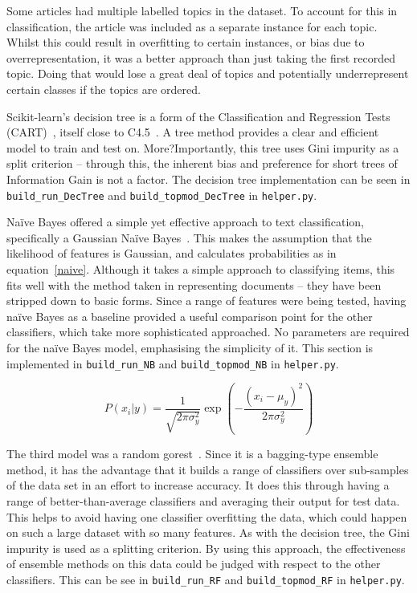 \documentclass[11pt]{article}
\begin{document}
Some articles had multiple labelled topics in the dataset. To account for this in classification, the article was included as a separate instance for each topic. Whilst this could result in overfitting to certain instances, or bias due to overrepresentation, it was a better approach than just taking the first recorded topic. Doing that would lose a great deal of topics and potentially underrepresent certain classes if the topics are ordered.

Scikit-learn's decision tree is a form of the Classification and Regression Tests (CART)~\cite{trees}, itself close to C4.5~\cite{c45}. A tree method provides a clear and efficient model to train and test on. More?Importantly, this tree uses Gini impurity as a split criterion – through this, the inherent bias and preference for short trees of Information Gain is not a factor. The decision tree implementation can be seen in \texttt{build\_run\_DecTree} and \texttt{build\_topmod\_DecTree} in \texttt{helper.py}.


Na{\"i}ve Bayes offered a simple yet effective approach to text classification, specifically a Gaussian Na{\"i}ve Bayes~\cite{nb}. This makes the assumption that the likelihood of features is Gaussian, and calculates probabilities as in equation~\ref{naive}.  Although it takes a simple approach to classifying items, this fits well with the method taken in representing documents – they have been stripped down to basic forms. Since a range of features were being tested, having na{\"i}ve Bayes as a baseline provided a useful comparison point for the other classifiers, which take more sophisticated approached. No parameters are required for the na{\"i}ve Bayes model, emphasising the simplicity of it. This section is implemented in \texttt{build\_run\_NB} and \texttt{build\_topmod\_NB} in \texttt{helper.py}.

\begin{equation}
\label{naive}
P(x_{i} \vert y) = \frac{1}{\sqrt{2 \pi \sigma_{y}^{2}}}\exp\left(-\frac{(x_{i}-\mu_{y})^{2}}{2\pi \sigma_{y}^{2}}\right)
\end{equation}

The third model was a random gorest~\cite{randomforests}. Since it is a bagging-type ensemble method, it has the advantage that it builds a range of classifiers over sub-samples of the data set in an effort to increase accuracy. It does this through having a range of better-than-average classifiers and averaging their output for test data. This helps to avoid having one classifier overfitting the data, which could happen on such a large dataset with so many features. As with the decision tree, the Gini impurity is used as a splitting criterion. By using this approach, the effectiveness of ensemble methods on this data could be judged with respect to the other classifiers. This can be see in \texttt{build\_run\_RF} and \texttt{build\_topmod\_RF} in \texttt{helper.py}.
\end{document}
